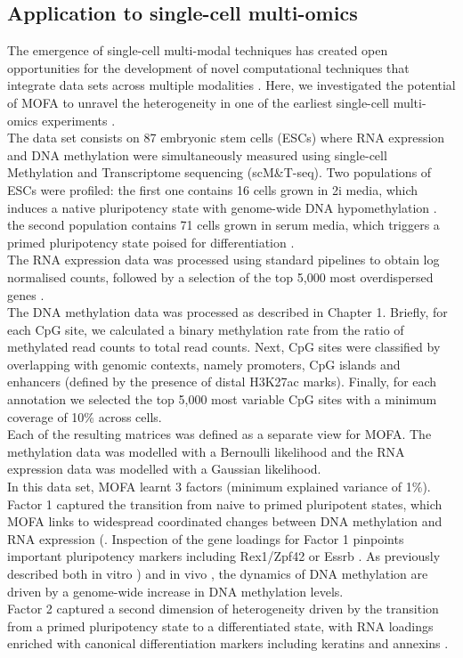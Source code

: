 

\subsection{Application to single-cell multi-omics} \label{section:mofa_scmt}
The emergence of single-cell multi-modal techniques has created open opportunities for the development of novel computational techniques that integrate data sets across multiple modalities \cite{Stuart2019,Colome-Tatche2018,Chappell2018}. Here, we investigated the potential of MOFA to unravel the heterogeneity in one of the earliest single-cell multi-omics experiments \cite{Angermueller2016}.\\
The data set consists on 87 embryonic stem cells (ESCs) where RNA expression and DNA methylation were simultaneously measured using single-cell Methylation and Transcriptome sequencing (scM\&T-seq). Two populations of ESCs were profiled: the first one contains 16 cells grown in 2i media, which induces a native pluripotency state with genome-wide DNA hypomethylation \cite{Ficz2013}. the second population contains 71 cells grown in serum media, which triggers a primed pluripotency state poised for differentiation \cite{Tosolini2016}.\\

The RNA expression data was processed using standard pipelines to obtain log normalised counts, followed by a selection of the top 5,000 most overdispersed genes \cite{Lun2016}.\\
The DNA methylation data was processed as described in Chapter 1. Briefly, for each CpG site, we calculated a binary methylation rate from the ratio of methylated read counts to total read counts. Next, CpG sites were classified by overlapping with genomic contexts, namely promoters, CpG islands and enhancers (defined by the presence of distal H3K27ac marks). Finally, for each annotation we selected the top 5,000 most variable CpG sites with a minimum coverage of 10\% across cells.\\
Each of the resulting matrices was defined as a separate view for MOFA. The methylation data was modelled with a Bernoulli likelihood and the RNA expression data was modelled with a Gaussian likelihood.\\

In this data set, MOFA learnt 3 factors (minimum explained variance of 1\%). Factor 1 captured the transition from naive to primed pluripotent states, which MOFA links to widespread coordinated changes between DNA methylation and RNA expression (. Inspection of the gene loadings for Factor 1 pinpoints important pluripotency markers including  Rex1/Zpf42 or Essrb \cite{Mohammed2017}. As previously described both in vitro \cite{Angermueller2016}) and in vivo \cite{Auclair2014}, the dynamics of DNA methylation are driven by a genome-wide increase in DNA methylation levels.\\
Factor 2 captured a second dimension of heterogeneity driven by the transition from a primed pluripotency state to a differentiated state, with RNA loadings enriched with canonical differentiation markers including keratins and annexins \cite{Fuchs1988}.\\

